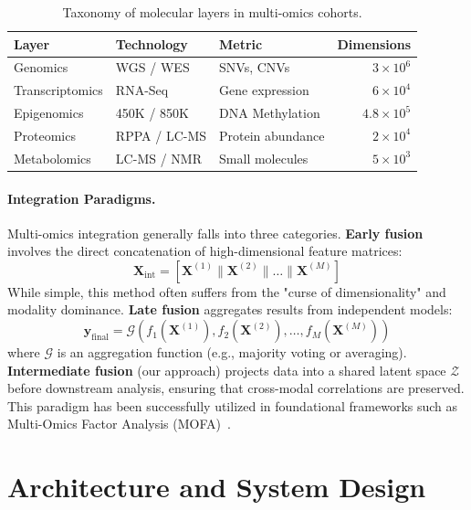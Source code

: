 \documentclass[runningheads]{llncs}
\begin{document}
\begin{table}[H]
\caption{Taxonomy of molecular layers in multi-omics cohorts.}\label{tab:taxonomy}
\centering
\small
\begin{tabular}{l l l r}
\toprule
\textbf{Layer} & \textbf{Technology} & \textbf{Metric} & \textbf{Dimensions} \\
\midrule
Genomics        & WGS / WES     & SNVs, CNVs        & $3 \times 10^6$ \\
Transcriptomics & RNA-Seq       & Gene expression   & $6 \times 10^4$ \\
Epigenomics     & 450K / 850K   & DNA Methylation   & $4.8 \times 10^5$ \\
Proteomics      & RPPA / LC-MS  & Protein abundance & $2 \times 10^4$ \\
Metabolomics    & LC-MS / NMR   & Small molecules   & $5 \times 10^3$ \\
\bottomrule
\end{tabular}
\end{table}

\paragraph{Integration Paradigms.}
Multi-omics integration generally falls into three categories.
\textbf{Early fusion} involves the direct concatenation of high-dimensional feature matrices:
\begin{equation}
\mathbf{X}_{\text{int}} = \left[ \mathbf{X}^{(1)} \parallel \mathbf{X}^{(2)} \parallel \dots \parallel \mathbf{X}^{(M)} \right]
\end{equation}
While simple, this method often suffers from the "curse of dimensionality" and modality dominance.
\textbf{Late fusion} aggregates results from independent models:
\begin{equation}
\mathbf{y}_{\text{final}} = \mathcal{G}(f_1(\mathbf{X}^{(1)}), f_2(\mathbf{X}^{(2)}), \dots, f_M(\mathbf{X}^{(M)}))
\end{equation}
where $\mathcal{G}$ is an aggregation function (e.g., majority voting or averaging).
\textbf{Intermediate fusion} (our approach) projects data into a shared latent space $\mathcal{Z}$ before downstream analysis, ensuring that cross-modal correlations are preserved. This paradigm has been successfully utilized in foundational frameworks such as Multi-Omics Factor Analysis (MOFA)~\cite{argelaguet2018}.

\section{Architecture and System Design}
\end{document}
